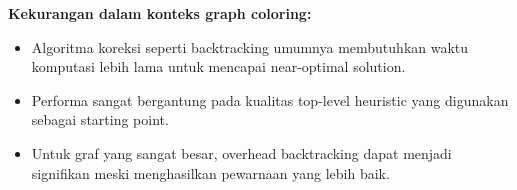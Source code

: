 \textbf{Kekurangan dalam konteks graph coloring:}
\begin{itemize}
    \item Algoritma koreksi seperti backtracking umumnya membutuhkan waktu komputasi lebih lama untuk mencapai near-optimal solution.
    \item Performa sangat bergantung pada kualitas top-level heuristic yang digunakan sebagai starting point.
    \item Untuk graf yang sangat besar, overhead backtracking dapat menjadi signifikan meski menghasilkan pewarnaan yang lebih baik.
\end{itemize}
